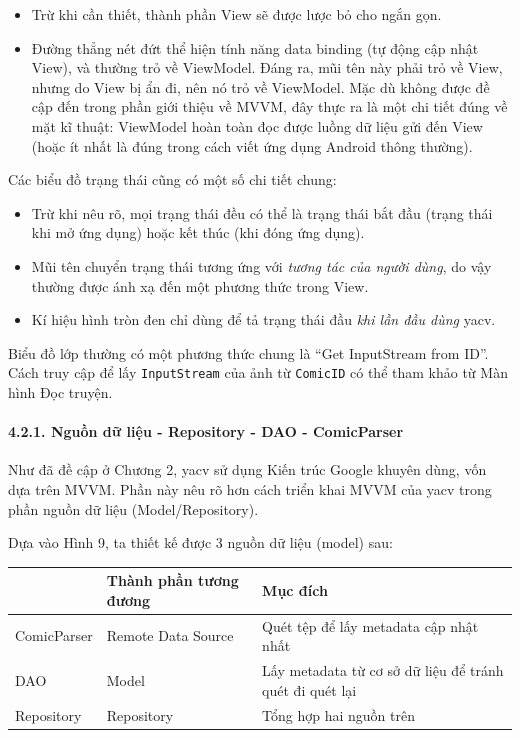 \documentclass[
]{article}
\providecommand{\tightlist}{%
  \setlength{\itemsep}{0pt}\setlength{\parskip}{0pt}}
\begin{document}
\begin{itemize}
\tightlist
\item
  Trừ khi cần thiết, thành phần View sẽ được lược bỏ cho ngắn gọn.
\item
  Đường thẳng nét đứt thể hiện tính năng data binding (tự động cập nhật
  View), và thường trỏ về ViewModel. Đáng ra, mũi tên này phải trỏ về
  View, nhưng do View bị ẩn đi, nên nó trỏ về ViewModel. Mặc dù không
  được đề cập đến trong phần giới thiệu về MVVM, đây thực ra là một chi
  tiết đúng về mặt kĩ thuật: ViewModel hoàn toàn đọc được luồng dữ liệu
  gửi đến View (hoặc ít nhất là đúng trong cách viết ứng dụng Android
  thông thường).
\end{itemize}

Các biểu đồ trạng thái cũng có một số chi tiết chung:

\begin{itemize}
\tightlist
\item
  Trừ khi nêu rõ, mọi trạng thái đều có thể là trạng thái bắt đầu (trạng
  thái khi mở ứng dụng) hoặc kết thúc (khi đóng ứng dụng).
\item
  Mũi tên chuyển trạng thái tương ứng với \emph{tương tác của người
  dùng}, do vậy thường được ánh xạ đến một phương thức trong View.
\item
  Kí hiệu hình tròn đen chỉ dùng để tả trạng thái đầu \emph{khi lần đầu
  dùng} yacv.
\end{itemize}

Biểu đồ lớp thường có một phương thức chung là ``Get InputStream from
ID''. Cách truy cập để lấy \texttt{InputStream} của ảnh từ
\texttt{ComicID} có thể tham khảo từ Màn hình Đọc truyện.

\hypertarget{nguux1ed3n-dux1eef-liux1ec7u---repository---dao---comicparser}{%
\paragraph{\texorpdfstring{4.2.1. Nguồn dữ liệu - Repository - DAO -
ComicParser
}{4.2.1. Nguồn dữ liệu - Repository - DAO - ComicParser }}\label{nguux1ed3n-dux1eef-liux1ec7u---repository---dao---comicparser}}

Như đã đề cập ở Chương 2, yacv sử dụng Kiến trúc Google khuyên dùng, vốn
dựa trên MVVM. Phần này nêu rõ hơn cách triển khai MVVM của yacv trong
phần nguồn dữ liệu (Model/Repository).

Dựa vào Hình 9, ta thiết kế được 3 nguồn dữ liệu (model) sau:

\begin{longtable}[]{@{}lll@{}}
\toprule
& Thành phần tương đương & Mục đích \\
\midrule
\endhead
ComicParser & Remote Data Source & Quét tệp để lấy metadata cập nhật
nhất \\
DAO & Model & Lấy metadata từ cơ sở dữ liệu để tránh quét đi quét lại \\
Repository & Repository & Tổng hợp hai nguồn trên \\
\bottomrule
\end{longtable}
\end{document}
